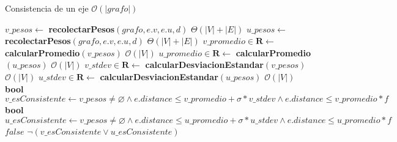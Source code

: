 \begin{algorithm}[H]
	\caption{Consistencia de un eje \Comment $\mathcal{O}(|grafo|)$}
	\begin{algorithmic}[1]
		\State $v\_pesos \gets$ \textbf{recolectarPesos}$(grafo, e.v, e.u, d)$ \Comment $\Theta(|V| + |E|)$
		\State $u\_pesos \gets$ \textbf{recolectarPesos}$(grafo, e.v, e.u, d)$ \Comment $\Theta(|V| + |E|)$
		\Statex
		\State $v\_promedio \in \mathbf{R} \gets$ \textbf{calcularPromedio}$(v\_pesos)$ \Comment $\mathcal{O}(|V|)$
		\State $u\_promedio \in \mathbf{R} \gets$ \textbf{calcularPromedio}$(u\_pesos)$ \Comment $\mathcal{O}(|V|)$
		\Statex
		\State $v\_stdev \in \mathbf{R} \gets$ \textbf{calcularDesviacionEstandar}$(v\_pesos)$ \Comment $\mathcal{O}(|V|)$
		\State $u\_stdev \in \mathbf{R} \gets$ \textbf{calcularDesviacionEstandar}$(u\_pesos)$ \Comment $\mathcal{O}(|V|)$
		\Statex
		\State\textbf{bool} $v\_esConsistente \gets v\_pesos \neq \varnothing \land e.distance \leq v\_promedio + \sigma * v\_stdev \land e.distance \leq v\_promedio * f$
		\State\textbf{bool} $u\_esConsistente \gets v\_pesos \neq \varnothing \land e.distance \leq u\_promedio + \sigma * u\_stdev \land e.distance \leq u\_promedio * f$
		\Statex
		\State \Return $false$
		\EndIf
		\Statex
		\State \Return $\neg(v\_esConsistente \lor u\_esConsistente)$
		\EndFunction
	\end{algorithmic}
\end{algorithm}